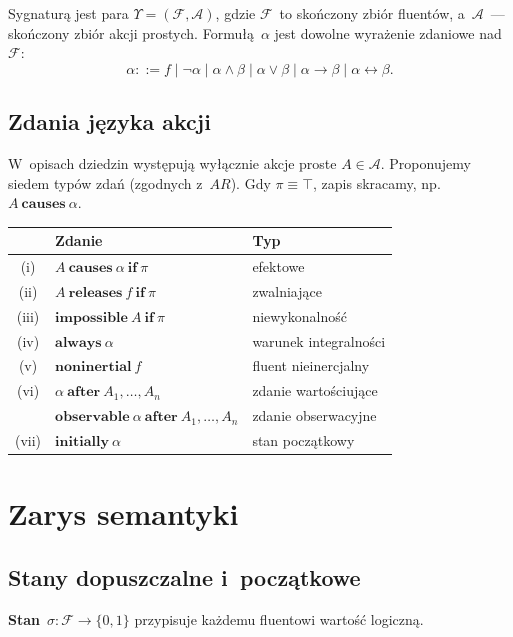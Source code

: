 \documentclass[11pt,a4paper]{article}
\newcommand{\causes}{\textbf{causes}}
\newcommand{\aft}{\textbf{after}}
\renewcommand{\iff}{\textbf{if}}
\newcommand{\initially}{\textbf{initially}}
\newcommand{\always}{\textbf{always}}
\newcommand{\impossible}{\textbf{impossible}}
\newcommand{\releases}{\textbf{releases}}
\newcommand{\noninertial}{\textbf{noninertial}}
\newcommand{\observable}{\textbf{observable}}
\newcommand{\Ac}{\mathcal{A}}
\newcommand{\F}{\mathcal{F}}
\begin{document}
Sygnaturą jest para $\Upsilon = (\F, \Ac)$, gdzie $\F$~to skończony
zbiór fluentów, a~$\Ac$~--- skończony zbiór akcji prostych.
Formułą~$\alpha$ jest dowolne wyrażenie zdaniowe nad~$\F$:
\[
  \alpha ::= f \mid \neg\alpha \mid \alpha \land \beta \mid
             \alpha \lor \beta \mid \alpha \to \beta \mid
             \alpha \leftrightarrow \beta.
\]

\subsection{Zdania języka akcji}

W~opisach dziedzin występują wyłącznie akcje proste $A \in \Ac$.
Proponujemy siedem typów zdań (zgodnych z~$AR$).
Gdy $\pi \equiv \top$, zapis skracamy, np.\ $A\ \causes\ \alpha$.

\begin{table}[h]
\centering
\begin{tabular}{cll}
\toprule
& \textbf{Zdanie} & \textbf{Typ} \\
\midrule
(i)   & $A\ \causes\ \alpha\ \iff\ \pi$ & efektowe \\
(ii)  & $A\ \releases\ f\ \iff\ \pi$ & zwalniające \\
(iii) & $\impossible\ A\ \iff\ \pi$ & niewykonalność \\
(iv)  & $\always\ \alpha$ & warunek integralności \\
(v)   & $\noninertial\ f$ & fluent nieinercjalny \\
(vi)  & $\alpha\ \aft\ A_1, \ldots, A_n$ & zdanie wartościujące \\
      & $\observable\ \alpha\ \aft\ A_1, \ldots, A_n$ & zdanie obserwacyjne \\
(vii) & $\initially\ \alpha$ & stan początkowy \\
\bottomrule
\end{tabular}
\end{table}

\section{Zarys semantyki}

\subsection{Stany dopuszczalne i~początkowe}

\textbf{Stan}~$\sigma \colon \F \to \{0,1\}$ przypisuje każdemu fluentowi
wartość logiczną.
\end{document}

